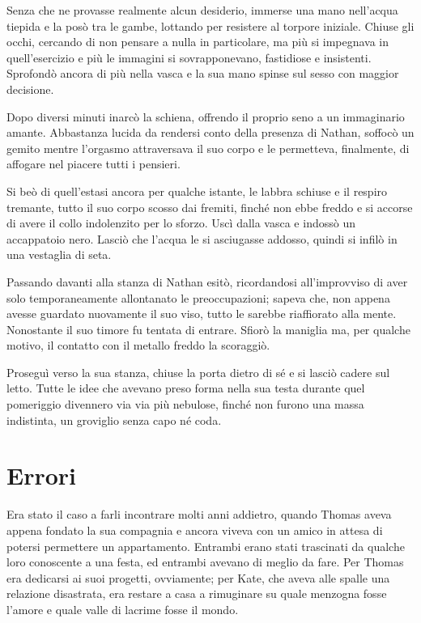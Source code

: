 \documentclass[a4paper,oneside,10pt]{memoir}
\begin{document}
Senza che ne provasse realmente alcun desiderio, immerse una mano nell'acqua tiepida e la posò tra le gambe, lottando
per resistere al torpore iniziale. Chiuse gli occhi, cercando di non pensare a nulla in particolare, ma più si
impegnava in quell'esercizio e più le immagini si sovrapponevano, fastidiose e insistenti. Sprofondò ancora di più
nella vasca e la sua mano spinse sul sesso con maggior decisione.

Dopo diversi minuti inarcò la schiena, offrendo il proprio seno a un immaginario amante. Abbastanza lucida da rendersi
conto della presenza di Nathan, soffocò un gemito mentre l'orgasmo attraversava il suo corpo e le permetteva,
finalmente, di affogare nel piacere tutti i pensieri.

Si beò di quell'estasi ancora per qualche istante, le labbra schiuse e il respiro tremante, tutto il suo corpo scosso
dai fremiti, finché non ebbe freddo e si accorse di avere il collo indolenzito per lo sforzo. Uscì dalla vasca e
indossò un accappatoio nero. Lasciò che l'acqua le si asciugasse addosso, quindi si infilò in una vestaglia di seta.

Passando davanti alla stanza di Nathan esitò, ricordandosi all'improvviso di aver solo temporaneamente allontanato le
preoccupazioni; sapeva che, non appena avesse guardato nuovamente il suo viso, tutto le sarebbe riaffiorato alla mente.
Nonostante il suo timore fu tentata di entrare. Sfiorò la maniglia ma, per qualche motivo, il contatto con il metallo
freddo la scoraggiò.

Proseguì verso la sua stanza, chiuse la porta dietro di sé e si lasciò cadere sul letto. Tutte le idee che avevano
preso forma nella sua testa durante quel pomeriggio divennero via via più nebulose, finché non furono una massa
indistinta, un groviglio senza capo né coda.

\chapter{Errori}

Era stato il caso a farli incontrare molti anni addietro, quando Thomas aveva appena fondato la sua compagnia e ancora
viveva con un amico in attesa di potersi permettere un appartamento. Entrambi erano stati trascinati da qualche loro
conoscente a una festa, ed entrambi avevano di meglio da fare. Per Thomas era dedicarsi ai suoi progetti, ovviamente;
per Kate, che aveva alle spalle una relazione disastrata, era restare a casa a rimuginare su quale menzogna fosse
l'amore e quale valle di lacrime fosse il mondo.
\end{document}
